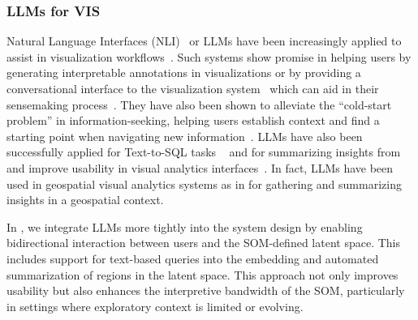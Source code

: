 \subsubsection{LLMs for VIS}
Natural Language Interfaces (NLI)~\cite{shen_towards_2023} or LLMs have been increasingly applied to assist in visualization workflows~\cite{hutchinson_llm_2024, zhang_natural_2024, zhao_leva_2025}.
%
Such systems show promise in helping users by generating interpretable annotations in visualizations or by providing a conversational interface to the visualization system~\cite{wu_chartinsights_2024,shen_towards_2023} which can aid in their sensemaking process~\cite{bernard_comparing_2018,rahman_qualitative_2025}.
%
They have also been shown to alleviate the ``cold-start problem'' in information-seeking, helping users establish context and find a starting point when navigating new information~\cite{liu_selenite_2024}.
%
LLMs have also been successfully applied for Text-to-SQL tasks ~\cite{zhang_natural_2024, li_dawn_2024} and for summarizing insights from and improve usability in visual analytics interfaces~\cite{zhao_leva_2025}.
%
In fact, LLMs have been used in geospatial visual analytics systems as in \cite{li_save_2024} for gathering and summarizing insights in a geospatial context.
%

In \ClimateSOM, we integrate LLMs more tightly into the system design by enabling bidirectional interaction between users and the SOM-defined latent space. This includes support for text-based queries into the embedding and automated summarization of regions in the latent space. This approach not only improves usability but also enhances the interpretive bandwidth of the SOM, particularly in settings where exploratory context is limited or evolving.



%
%

